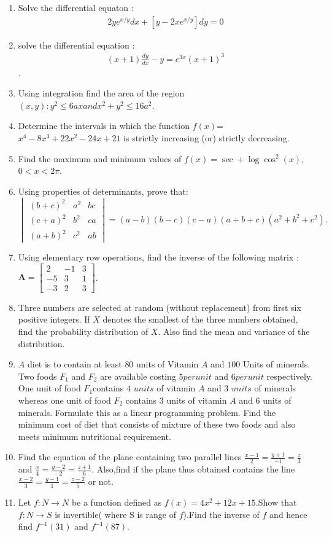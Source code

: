 \documentclass[12pt,-letter paper]{article}
\let\vec\mathbf{}
\let\vec\mathbf{}
\let\vec\mathbf{}
\providecommand{\mydet}[1]{\ensuremath{\begin{vmatrix}#1\end{vmatrix}}}
\providecommand{\myvec}[1]{\ensuremath{\begin{bmatrix}#1\end{bmatrix}}}
\begin{document}
\begin{enumerate}
\item Solve the differential equaton : \begin{align*}2ye^{x/y}dx+[y-2xe^{x/y}]dy=0\end{align*}
\item solve the differential equation : \begin{align*}(x+1)\frac{dy}{dx}-y=e^{3x}(x+1)^3\end{align*}.
\item Using integration find the area of the region ${(x,y):y^2 \leq 6 ax and x^2+y^2 \leq 16a^2}$.	
\item Determine the intervals in which the function $f(x)$=$x^4-8x^3+22x^2-24x+21$ is strictly increasing (or) strictly decreasing.
\item Find the maximum and minimum values of $f(x) =\sec+\log\cos^2(x)$,$0<x<2\pi$.
\item Using properties of determinants, prove that: 
$\mydet{ 
(b+c)^2 & a^2 & bc \\ 
(c+a)^2 & b^2 & ca \\ 
(a+b)^2 & c^2 & ab } = (a-b)(b-c)(c-a)(a+b+c)(a^2+b^2+c^2).
$
\item Using elementary row operations, find the inverse of the following matrix : $\vec{A}= \myvec{2&-1&3\\-5&3&1\\-3&2&3}$.
\item Three numbers are selected at random (without replacement) from first six positive integers. If $X$ denotes the smallest of the three numbers obtained, find the probability distribution of $X$. Also find the mean and variance of the distribution.
\item $A$ diet is to contain at least $80$ units of Vitamin $A$ and $100$ Units of minerals. Two foods $F_1$ and $F_2$ are available costing \rupee$5 per unit$ and \rupee$6 per unit$ respectively. One unit of food $F_1$contains $4$ $units$ of vitamin $A$ and $3$ $units$ of minerals whereas one unit of food $F_2$ contains $3$ units of vitamin $A$ and $6$ units of minerals. Formulate this as a linear programming problem. Find the minimum cost of diet that consists of mixture of these two foods and also meets minimum nutritional requirement.
\item  Find the equation of the plane containing two parallel lines  $\frac{x-1}{2}=\frac{y+1}{-1}=\frac{z}{3}$ and $\frac{x}{4}=\frac{y-2}{-2}=\frac{z+1}{6}.$ Also,find if the plane thus obtained contains  the line $\frac{x-2}{3}=\frac{y-1}{1}=\frac{z-2}{5}$ or not.
\item Let $f : N \rightarrow N$ be a function defined as $f(x)= 4x^{2}+12x+15$.Show that $f:N \rightarrow S$ is invertible( where S is range of $f$).Find the inverse of $f$ and hence find $f^{-1}(31)$ and $f^{-1}(87)$.
\end{enumerate}
\end{document}

